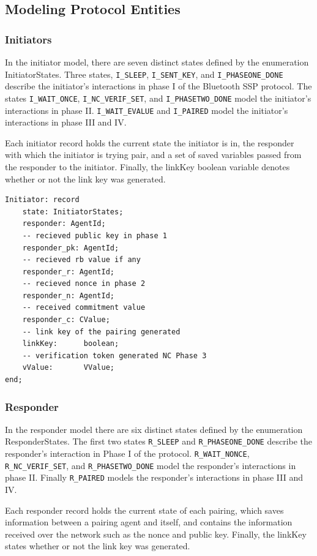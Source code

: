 \documentclass{acm_proc_article-sp}
\begin{document}
\subsection{Modeling Protocol Entities}

\subsubsection{Initiators}
In the initiator model, there are seven distinct states defined by the enumeration InitiatorStates. Three states, \texttt{I\_SLEEP}, \texttt{I\_SENT\_KEY}, and \texttt{I\_PHASEONE\_DONE} describe the initiator's interactions in phase I of the Bluetooth SSP protocol. The states \texttt{I\_WAIT\_ONCE}, \texttt{I\_NC\_VERIF\_SET}, and \texttt{I\_PHASETWO\_DONE} model the initiator's interactions in phase II. \texttt{I\_WAIT\_EVALUE} and \texttt{I\_PAIRED} model the initiator's interactions in phase III and IV.

Each initiator record holds the current state the initiator is in, the responder with which the initiator is trying pair, and a set of saved variables passed from the responder to the initiator. Finally, the linkKey boolean variable denotes whether or not the link key was generated.

\begin{verbatim}
Initiator: record
    state: InitiatorStates;
    responder: AgentId;
    -- recieved public key in phase 1
    responder_pk: AgentId;
    -- recieved rb value if any
    responder_r: AgentId;
    -- recieved nonce in phase 2
    responder_n: AgentId;
    -- received commitment value
    responder_c: CValue;
    -- link key of the pairing generated
    linkKey:      boolean;
    -- verification token generated NC Phase 3
    vValue:       VValue;
end;
\end{verbatim}

\subsubsection{Responder}
In the responder model there are six distinct states defined by the enumeration ResponderStates. The first two states \texttt{R\_SLEEP} and \texttt{R\_PHASEONE\_DONE} describe the responder's interaction in Phase I of the protocol. \texttt{R\_WAIT\_NONCE}, \texttt{R\_NC\_VERIF\_SET}, and \texttt{R\_PHASETWO\_DONE} model the responder's interactions in phase II. Finally \texttt{R\_PAIRED} models the responder's interactions in phase III and IV.

Each responder record holds the current state of each pairing, which saves information between a pairing agent and itself, and contains the information received over the network such as the nonce and public key. Finally, the linkKey states whether or not the link key was generated.
\end{document}
